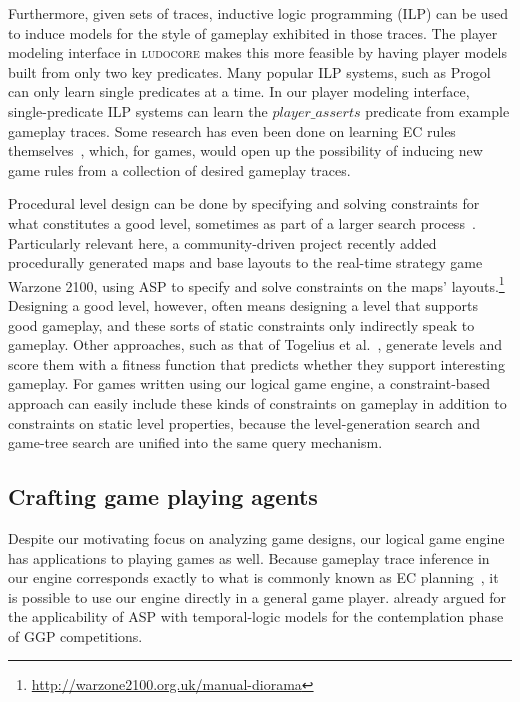 \documentclass[letterpaper]{article}
\newcommand{\ludocore}{\textsc{ludocore}}
\newcommand{\logical}[1]{$#1$}
\begin{document}
Furthermore, given sets of traces, inductive logic programming (ILP) can be
used to induce models for the style of gameplay exhibited in those traces. The
player modeling interface in \ludocore{} makes this more feasible by
having player models built from only two key predicates. Many popular ILP
systems, such as Progol~\citep{Progol} can only learn single predicates at a
time. In our player modeling interface, single-predicate ILP systems can learn
the \logical{player\_asserts} predicate from example gameplay traces. Some research has
even been done on learning EC rules themselves~\citep{ECILP}, which, for games,
would open up the possibility of inducing new game rules from a collection of
desired gameplay traces.

Procedural level design can be done by specifying and solving constraints for
what constitutes a good level, sometimes as part of a larger search
process~\cite[e.g.][]{Gillian:FDG09}. Particularly relevant here, a
community-driven project recently added procedurally generated maps and base
layouts to the real-time strategy game Warzone 2100, using ASP to specify and
solve constraints on the maps'
layouts.\footnote{\url{http://warzone2100.org.uk/manual-diorama}} Designing a good level,
however, often means designing a level that supports good gameplay, and these
sorts of static constraints only indirectly speak to gameplay. Other
approaches, such as that of Togelius et al.~\citeyearpar{Togelius:levels},
generate levels and score them with a fitness function that predicts whether
they support interesting gameplay. For games written using our logical game
engine, a constraint-based approach can easily include these kinds of
constraints on gameplay in addition to constraints on static level properties,
because the level-generation search and game-tree search are unified into the
same query mechanism. 

\subsection{Crafting game playing agents}

Despite our motivating focus on analyzing game designs, our logical game engine
has applications to playing games as well. Because gameplay trace inference in
our engine corresponds exactly to what is commonly known as EC
planning~\citep{ECplanning}, it is possible to use our engine directly in a
general game player. \citet{Thielscher:singleplayer} already argued for the
applicability of ASP with temporal-logic models for the contemplation phase of
GGP competitions.
\end{document}
